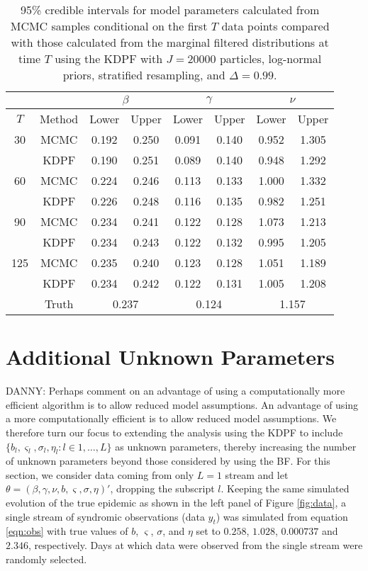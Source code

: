 \documentclass{elsarticle}
\newcommand{\danny}[1]{{\color{blue} DANNY: #1}}
\begin{document}
\begin{table}
\begin{center}
\begin{tabular}{|c|c|cc|cc|cc|}
\hline
 & & \multicolumn{2}{|c|}{$\beta$} & \multicolumn{2}{|c|}{$\gamma$} & \multicolumn{2}{|c|}{$\nu$} \\
\hline
$T$ & Method & Lower & Upper & Lower & Upper & Lower & Upper \\
\hline
30 & MCMC & 0.192 & 0.250 & 0.091 & 0.140 & 0.952 & 1.305 \\
   & KDPF & 0.190 & 0.251 & 0.089 & 0.140 & 0.948 & 1.292 \\
\hline
60 & MCMC & 0.224 & 0.246 & 0.113 & 0.133 & 1.000 & 1.332 \\
   & KDPF & 0.226 & 0.248 & 0.116 & 0.135 & 0.982 & 1.251 \\
\hline
90 & MCMC & 0.234 & 0.241 & 0.122 & 0.128 & 1.073 & 1.213 \\
   & KDPF & 0.234 & 0.243 & 0.122 & 0.132 & 0.995 & 1.205 \\
\hline
125 & MCMC & 0.235 & 0.240 & 0.123 & 0.128 & 1.051 & 1.189 \\
   & KDPF & 0.234 & 0.242 & 0.122 & 0.131 & 1.005 & 1.208 \\
\hline
 & Truth & \multicolumn{2}{|c|}{0.237} & \multicolumn{2}{|c|}{0.124} & \multicolumn{2}{|c|}{1.157} \\
\hline
\end{tabular}
\caption{95\% credible intervals for model parameters calculated from MCMC samples conditional on the first $T$ data points compared with those calculated from the marginal filtered distributions at time $T$ using the KDPF with $J = 20000$ particles, log-normal priors, stratified resampling, and $\Delta = 0.99$.}
\label{tab:mcmc}
\end{center}
\end{table}

\section{Additional Unknown Parameters \label{sec:extend}}

\danny{Perhaps comment on an advantage of using a computationally more efficient algorithm is to allow reduced model assumptions.} An advantage of using a more computationally efficient is to allow reduced model assumptions. We therefore turn our focus to extending the analysis using the KDPF to include $\{b_l,\varsigma_l,\sigma_l,\eta_l:l\in1,\ldots,L\}$ as unknown parameters, thereby increasing the number of unknown parameters beyond those considered by \citet{skvortsov2012monitoring} using the BF. For this section, we consider data coming from only $L = 1$ stream and let $\theta = (\beta, \gamma, \nu, b, \varsigma, \sigma, \eta)'$, dropping the subscript $l$. Keeping the same simulated evolution of the true epidemic as shown in the left panel of Figure \ref{fig:data}, a single stream of syndromic observations (data $y_t$) was simulated from equation \eqref{eqn:obs} with true values of $b$, $\varsigma$, $\sigma$, and $\eta$ set to $0.258$, $1.028$, $0.000737$ and $2.346$, respectively. Days at which data were observed from the single stream were randomly selected.
\end{document}
